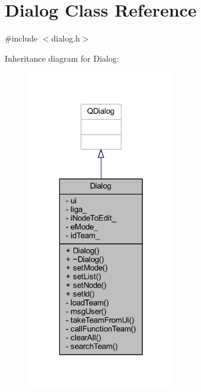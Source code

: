 \hypertarget{class_dialog}{}\section{Dialog Class Reference}
\label{class_dialog}


{\ttfamily \#include $<$dialog.\+h$>$}



Inheritance diagram for Dialog\+:\nopagebreak
\begin{figure}[H]
\begin{center}
\leavevmode
\includegraphics[width=184pt]{d0/d57/class_dialog__inherit__graph}
\end{center}
\end{figure}


